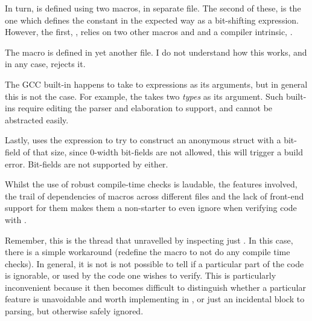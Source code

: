In turn,  is defined using two macros, in separate file. The
second of these,  is the one which defines the constant in
the expected way as a bit-shifting expression. However, the first,
, relies on two other macros
 and  and a compiler
intrinsic, .


The  macro is defined in yet another file. I do not
understand how this works, and in any case,  rejects it.


The GCC built-in  happens to take to expressions
as its arguments, but in general this is not the case. For example, the
 takes two \emph{types} as
its argument. Such built-ins require editing the parser and elaboration to
support, and cannot be abstracted easily.

Lastly,  uses the expression to try to construct an
anonymous struct with a bit-field of that size, since 0-width bit-fields are
not allowed, this will trigger a build error. Bit-fields are not supported by
 either.


Whilst the use of robust compile-time checks is laudable, the features
involved, the trail of dependencies of macros across different files and the
lack of  front-end support for them makes them a non-starter to
even ignore when verifying code with .

Remember, this is the thread that unravelled by inspecting just
. In this case, there is a simple workaround
(redefine the  macro to not do any compile time checks). In
general, it is not is not possible to tell if a particular part of the code is
ignorable, or used by the code one wishes to verify. This is particularly
inconvenient because it then becomes difficult to distinguish whether a
particular feature is unavoidable and worth implementing in , or
just an incidental block to parsing, but otherwise safely ignored.


